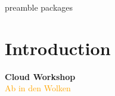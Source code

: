 \RequirePackage{import}
{preamble}
{packages}


    \section{Introduction}\label{sec:introduction}

    \begin{frame}[c]
        \centering
        \Huge
        \textbf{Cloud Workshop}
        \\
        \vspace{1ex}
        \Large
        \textcolor{orange}{Ab in den Wolken}
    \end{frame}


